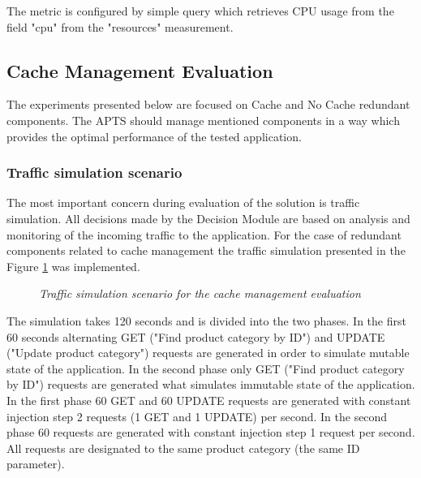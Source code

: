 \documentclass[12pt,a4paper]{article}
\begin{document}
The metric is configured by simple query which retrieves CPU usage from the field "cpu" from the "resources" measurement.  

\subsection{Cache Management Evaluation} \label{section:cachemenagementevaluation}

The experiments presented below are focused on Cache and No Cache redundant components. The APTS should manage mentioned components in a way which provides the optimal performance of the tested application.

\subsubsection{Traffic simulation scenario} \label{trafficcachesim}

The most important concern during evaluation of the solution is traffic simulation. All decisions made by the Decision Module are based on analysis and monitoring of the incoming traffic to the application. For the case of redundant components related to cache management the traffic simulation presented in the Figure \ref{trafficcache} was implemented.

\begin{figure}[!htb]
\begin{center}
\end{center}
\caption{\textit{Traffic simulation scenario for the cache management evaluation}} \label{trafficcache}
\end{figure}

The simulation takes 120 seconds and is divided into the two phases. In the first 60 seconds alternating GET ("Find product category by ID") and UPDATE ("Update product category") requests are generated in order to simulate mutable state of the application. In the second phase only GET ("Find product category by ID") requests are generated what simulates immutable state of the application. In the first phase 60 GET and 60 UPDATE requests are generated with constant injection step 2 requests (1 GET and 1 UPDATE) per second. In the second phase 60 requests are generated with constant injection step 1 request per second. All requests are designated to the same product category (the same ID parameter). 
\end{document}

